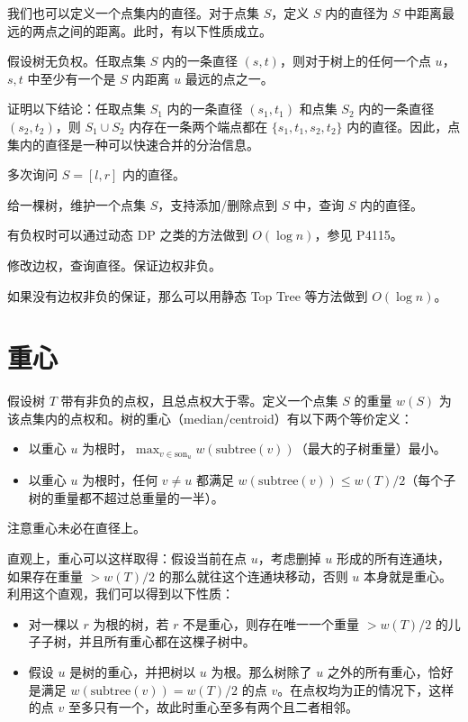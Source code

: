 我们也可以定义一个点集内的直径。对于点集 $S$，定义 $S$ 内的直径为 $S$ 中距离最远的两点之间的距离。此时，有以下性质成立。
\begin{property}
    假设树无负权。任取点集 $S$ 内的一条直径 $(s,t)$，则对于树上的任何一个点 $u$，$s,t$ 中至少有一个是 $S$ 内距离 $u$ 最远的点之一。 
\end{property}
\begin{exercise}
    证明以下结论：任取点集 $S_1$ 内的一条直径 $(s_1,t_1)$ 和点集 $S_2$ 内的一条直径 $(s_2,t_2)$，则 $S_1\cup S_2$ 内存在一条两个端点都在 $\{s_1,t_1,s_2,t_2\}$ 内的直径。因此，点集内的直径是一种可以快速合并的分治信息。
\end{exercise}
\begin{exercise}
    多次询问 $S=[l,r]$ 内的直径。
\end{exercise}
\begin{exercise}
    给一棵树，维护一个点集 $S$，支持添加/删除点到 $S$ 中，查询 $S$ 内的直径。
\end{exercise}
\begin{remark}
    有负权时可以通过动态 DP 之类的方法做到 $O(\log n)$，参见 P4115。
\end{remark}
\begin{example}[CF1192B]
    修改边权，查询直径。保证边权非负。
\end{example}
\begin{remark}
    如果没有边权非负的保证，那么可以用静态 Top Tree 等方法做到 $O(\log n)$。
\end{remark}

\section{重心}

假设树 $T$ 带有非负的点权，且总点权大于零。定义一个点集 $S$ 的重量 $w(S)$ 为该点集内的点权和。树的重心（median/centroid）有以下两个等价定义：
\begin{itemize}
    \item 以重心 $u$ 为根时，$\max_{v\in \mathrm{son}_u}w(\mathrm{subtree}(v))$（最大的子树重量）最小。
    \item 以重心 $u$ 为根时，任何 $v\ne u$ 都满足 $w(\mathrm{subtree}(v)) \le w(T)/2$（每个子树的重量都不超过总重量的一半）。
\end{itemize}
\begin{remark}
    注意重心未必在直径上。
\end{remark}
直观上，重心可以这样取得：假设当前在点 $u$，考虑删掉 $u$ 形成的所有连通块，如果存在重量 $>w(T)/2$ 的那么就往这个连通块移动，否则 $u$ 本身就是重心。利用这个直观，我们可以得到以下性质：
\begin{property}
    \begin{itemize}
        \item 对一棵以 $r$ 为根的树，若 $r$ 不是重心，则存在唯一一个重量 $>w(T)/2$ 的儿子子树，并且所有重心都在这棵子树中。
        \item 假设 $u$ 是树的重心，并把树以 $u$ 为根。那么树除了 $u$ 之外的所有重心，恰好是满足 $w(\mathrm{subtree}(v))=w(T)/2$ 的点 $v$。在点权均为正的情况下，这样的点 $v$ 至多只有一个，故此时重心至多有两个且二者相邻。
    \end{itemize}
\end{property}

